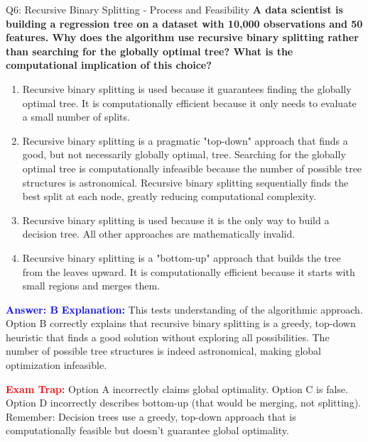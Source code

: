 \documentclass[8pt]{beamer}
\begin{document}
	\begin{frame}{Q6: Recursive Binary Splitting - Process and Feasibility}
		\fontsize{6.5}{7.5}\selectfont
		\textbf{A data scientist is building a regression tree on a dataset with 10,000 observations and 50 features. Why does the algorithm use recursive binary splitting rather than searching for the globally optimal tree? What is the computational implication of this choice?}
		
		\begin{enumerate}
			\item Recursive binary splitting is used because it guarantees finding the globally optimal tree. It is computationally efficient because it only needs to evaluate a small number of splits.
			\item Recursive binary splitting is a pragmatic "top-down" approach that finds a good, but not necessarily globally optimal, tree. Searching for the globally optimal tree is computationally infeasible because the number of possible tree structures is astronomical. Recursive binary splitting sequentially finds the best split at each node, greatly reducing computational complexity.
			\item Recursive binary splitting is used because it is the only way to build a decision tree. All other approaches are mathematically invalid.
			\item Recursive binary splitting is a "bottom-up" approach that builds the tree from the leaves upward. It is computationally efficient because it starts with small regions and merges them.
		\end{enumerate}
		
		\vspace{0.1cm}
		\textcolor{blue}{\textbf{Answer: B}}
		\vspace{0.1cm}
		\textcolor{blue}{\textbf{Explanation:}} This tests understanding of the algorithmic approach. Option B correctly explains that recursive binary splitting is a greedy, top-down heuristic that finds a good solution without exploring all possibilities. The number of possible tree structures is indeed astronomical, making global optimization infeasible.
		
		\textcolor{red}{\textbf{Exam Trap:}} Option A incorrectly claims global optimality. Option C is false. Option D incorrectly describes bottom-up (that would be merging, not splitting). Remember: Decision trees use a greedy, top-down approach that is computationally feasible but doesn't guarantee global optimality.
	\end{frame}
	
\end{document}
